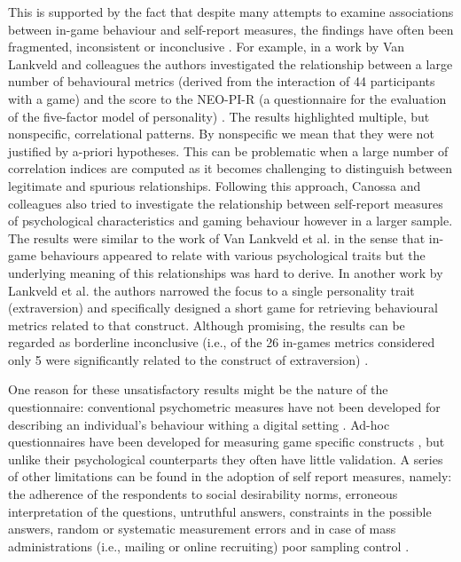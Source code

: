 This is supported by the fact that despite many attempts to examine associations between in-game behaviour and self-report measures, the findings have often been fragmented, inconsistent or inconclusive \cite{canossa2013give, stankevicius2015factor, schaekermann2017curiously}. For example, in a work by Van Lankveld and colleagues \cite{van2009psychologically} the authors investigated the relationship between a large number of behavioural metrics (derived from the interaction of 44 participants with a game) and the score to the NEO-PI-R (a questionnaire for the evaluation of the five-factor model of personality) \cite{costa2008revised}. The results highlighted multiple, but nonspecific, correlational patterns. By nonspecific we mean that they were not justified by a-priori hypotheses. This can be problematic when a large number of correlation indices are computed as it becomes challenging to distinguish between legitimate and spurious relationships. Following this approach, Canossa and colleagues \cite{canossa2013give} also tried to investigate the relationship between self-report measures of psychological characteristics and gaming behaviour however in a larger sample. The results were similar to the work of Van Lankveld et al. in the sense that in-game behaviours appeared to relate with various psychological traits but the underlying meaning of this relationships was hard to derive. In another work by Lankveld et al. the authors narrowed the focus to a single personality trait (extraversion)  and specifically designed a short game for retrieving behavioural metrics related to that construct. Although promising, the results can be regarded as borderline inconclusive (i.e., of the 26 in-games metrics considered only 5 were significantly related to the construct of extraversion) \cite{van2011games}. 

One reason for these unsatisfactory results might be the nature of the  questionnaire: conventional psychometric measures have not been developed for describing an individual's behaviour withing a digital setting \cite{yannakakis2013player}. Ad-hoc questionnaires have been developed for measuring game specific constructs \cite{yee2006motivations,tondello2016gamification}, but unlike their psychological counterparts they often have little validation. A series of other limitations can be found in the adoption of self report measures, namely: the adherence of the respondents to social desirability norms, erroneous interpretation of the questions, untruthful answers, constraints in the possible answers, random or systematic measurement errors and in case of mass administrations (i.e., mailing or online recruiting) poor sampling control \cite{van2009psychologically}.

